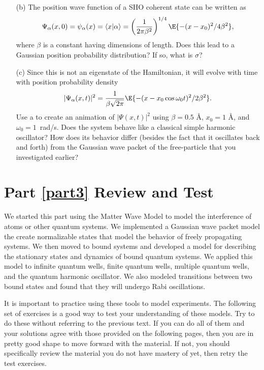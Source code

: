 \begin{exercise}
\begin{enumerate}
\item[(b)]   The position wave function of a SHO coherent state can be written as
%
\begin{equation}
\Psi_{\alpha}(x,0) = \psi_{\alpha}(x) = \langle x|\alpha\rangle = \left(\frac{1}{2\pi\beta^{2}}\right)^{1/4}
              \E{-(x -x_{0})^{2}/4\beta^{2}},
\end{equation}
%
where $\beta$ is a constant having dimensions of length.  Does this lead to a  Gaussian position probability distribution?  If so, what is $\sigma$?

\item[(c)] Since this is not an eigenstate of the Hamiltonian, it will evolve with time with position probability density
%
\begin{equation}
|\Psi_{\alpha}(x,t)|^{2} = \frac{1}{\beta\sqrt{2\pi}}
            \E{-(x - x_{0}\cos\omega_{0} t)^{2}/2\beta^{2}}.
\end{equation}
%
 Use a \CAS to create an animation of $|\Psi(x,t)|^{2}$ using $\beta =
0.5$ \AA, $x_{0} = 1$ \AA, and $\omega_{0} = 1$~rad/s.  Does the system behave like a classical simple harmonic oscillator?  How does its behavior differ (besides the fact that it oscillates back and forth) from the Gaussian wave packet of the free-particle that you investigated earlier?

\end{enumerate}

\end{exercise}


\chapter{Part \ref{part3} Review and Test}
We started this part using the Matter Wave Model to model the interference of atoms or other quantum systems. We implemented a Gaussian wave packet model the create normalizable states that model the behavior of freely propagating systems. We then moved to bound systems and developed a model for describing the stationary states and dynamics of bound quantum systems. We applied this model to infinite quantum wells, finite quantum wells, multiple quantum wells, and the quantum harmonic oscillator. We also modeled transitions between two bound states and found that they will undergo Rabi oscillations.

It is important to practice using these tools to model experiments. The following set of exercises is a good way to test your understanding of these models. Try to do these without referring to the previous text. If you can do all of them and your solutions agree with those provided on the following pages, then you are in pretty good shape to move forward with the material. If not, you should specifically review the material  you do not have mastery of yet, then retry the test exercises.

